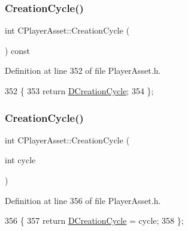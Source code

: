 \subsubsection{\texorpdfstring{Creation\+Cycle()}{CreationCycle()}\hspace{0.1cm}{\footnotesize\ttfamily [1/2]}}
{\footnotesize\ttfamily int C\+Player\+Asset\+::\+Creation\+Cycle (\begin{DoxyParamCaption}{ }\end{DoxyParamCaption}) const\hspace{0.3cm}{\ttfamily [inline]}}



Definition at line 352 of file Player\+Asset.\+h.


\begin{DoxyCode}
352                                  \{
353             \textcolor{keywordflow}{return} \hyperlink{classCPlayerAsset_a8b0efb3ddc27ee11f331ade667bc4b0d}{DCreationCycle};
354         \};
\end{DoxyCode}
\hypertarget{classCPlayerAsset_a101a234ccd90537c2900cde093bc8708}{}\label{classCPlayerAsset_a101a234ccd90537c2900cde093bc8708} 
\subsubsection{\texorpdfstring{Creation\+Cycle()}{CreationCycle()}\hspace{0.1cm}{\footnotesize\ttfamily [2/2]}}
{\footnotesize\ttfamily int C\+Player\+Asset\+::\+Creation\+Cycle (\begin{DoxyParamCaption}\item[{int}]{cycle }\end{DoxyParamCaption})\hspace{0.3cm}{\ttfamily [inline]}}



Definition at line 356 of file Player\+Asset.\+h.


\begin{DoxyCode}
356                                     \{
357             \textcolor{keywordflow}{return} \hyperlink{classCPlayerAsset_a8b0efb3ddc27ee11f331ade667bc4b0d}{DCreationCycle} = cycle;  
358         \};
\end{DoxyCode}
\hypertarget{classCPlayerAsset_ae2040e12e5319593c9a2d724c7b7eda0}{}\label{classCPlayerAsset_ae2040e12e5319593c9a2d724c7b7eda0} 
